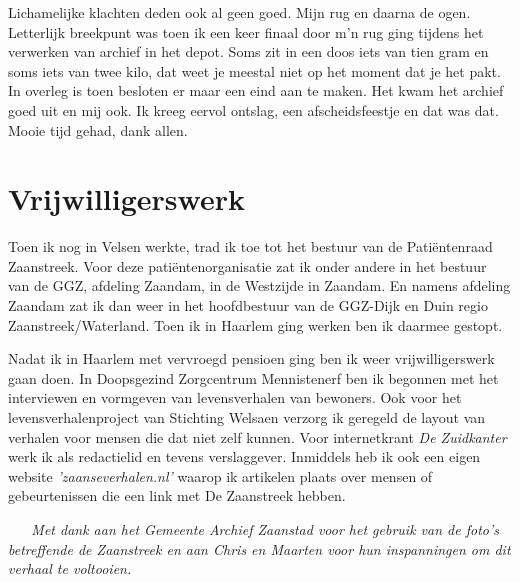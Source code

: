 \documentclass[12pt,twoside, openright]{memoir}
\begin{document}
Lichamelijke klachten deden ook al geen goed. Mijn rug en daarna de ogen. Letterlijk breekpunt was toen ik een keer finaal door m’n rug ging tijdens het verwerken van archief in het depot. Soms zit in een doos iets van tien gram en soms iets van twee kilo, dat weet je meestal niet op het moment dat je het pakt. In overleg is toen besloten er maar een eind aan te maken. Het kwam het archief goed uit en mij ook. Ik kreeg eervol ontslag, een afscheidsfeestje en dat was dat. Mooie tijd gehad, dank allen.

\section*{Vrijwilligerswerk} %
\label{cha:vrijwilligerswerk}

Toen ik nog in Velsen werkte, trad ik toe tot het bestuur van de Patiëntenraad Zaanstreek. Voor deze patiëntenorganisatie zat ik onder andere in het bestuur van de GGZ, afdeling Zaandam, in de Westzijde in Zaandam. En namens afdeling Zaandam zat ik dan weer in het hoofdbestuur van de GGZ-Dijk en Duin regio Zaanstreek/Waterland. Toen ik in Haarlem ging werken ben ik daarmee gestopt.

Nadat ik in Haarlem met vervroegd pensioen ging ben ik weer vrijwilligerswerk gaan doen. In Doopsgezind Zorgcentrum Mennistenerf ben ik begonnen met het interviewen en vormgeven van levensverhalen van bewoners. Ook voor het levensverhalenproject van Stichting Welsaen verzorg ik geregeld de layout van verhalen voor mensen die dat niet zelf kunnen. Voor internetkrant \emph{De Zuidkanter} werk ik als redactielid en tevens verslaggever. Inmiddels heb ik ook een eigen website \emph{'zaanseverhalen.nl'} waarop ik artikelen plaats over mensen of gebeurtenissen die een link met De Zaanstreek hebben.

\clearpage
\newpage
\thispagestyle{empty}
~
\newpage
\cleardoublepage
\thispagestyle{empty}
~
\vfil
\noindent \emph{Met dank aan het Gemeente Archief Zaanstad voor het gebruik van de foto's betreffende de Zaanstreek en aan Chris en Maarten voor hun inspanningen om dit verhaal te voltooien.}


\newpage
\thispagestyle{empty}
~

\newpage
\thispagestyle{empty}
~
\end{document}
